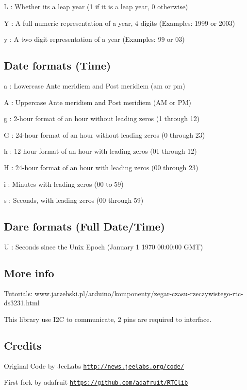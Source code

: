\begin{DoxyItemize}
\item L \+: Whether it\textquotesingle{}s a leap year (1 if it is a leap year, 0 otherwise)
\item Y \+: A full numeric representation of a year, 4 digits (Examples\+: 1999 or 2003)
\item y \+: A two digit representation of a year (Examples\+: 99 or 03)
\end{DoxyItemize}

\subsection*{Date formats (Time) }


\begin{DoxyItemize}
\item a \+: Lowercase Ante meridiem and Post meridiem (am or pm)
\item A \+: Uppercase Ante meridiem and Post meridiem (AM or PM)
\item g \+: 2-\/hour format of an hour without leading zeros (1 through 12)
\item G \+: 24-\/hour format of an hour without leading zeros (0 through 23)
\item h \+: 12-\/hour format of an hour with leading zeros (01 through 12)
\item H \+: 24-\/hour format of an hour with leading zeros (00 through 23)
\item i \+: Minutes with leading zeros (00 to 59)
\item s \+: Seconds, with leading zeros (00 through 59)
\end{DoxyItemize}

\subsection*{Dare formats (Full Date/\+Time) }


\begin{DoxyItemize}
\item U \+: Seconds since the Unix Epoch (January 1 1970 00\+:00\+:00 G\+MT)
\end{DoxyItemize}

\subsection*{More info }

Tutorials\+: www.\+jarzebski.\+pl/arduino/komponenty/zegar-\/czasu-\/rzeczywistego-\/rtc-\/ds3231.html

This library use I2C to communicate, 2 pins are required to interface.

\subsection*{Credits }

Original Code by Jee\+Labs \href{http://news.jeelabs.org/code/}{\tt http\+://news.\+jeelabs.\+org/code/}

First fork by adafruit \href{https://github.com/adafruit/RTClib}{\tt https\+://github.\+com/adafruit/\+R\+T\+Clib} 